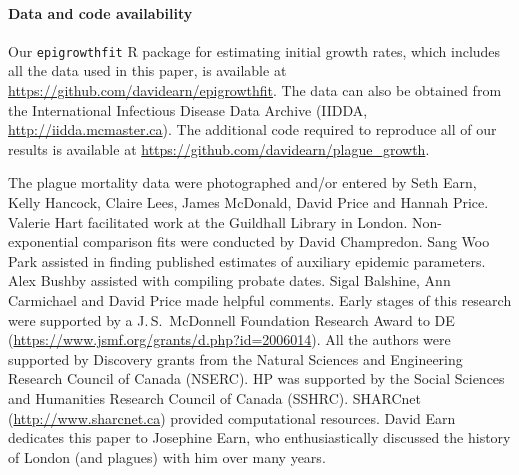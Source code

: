 \hypertarget{data.and.code}{}
\paragraph{Data and code availability}

Our \texttt{epigrowthfit} R package for estimating initial growth
rates, which includes all the data used in this paper, is available at
\url{https://github.com/davidearn/epigrowthfit}.  The data can also be
obtained from the International Infectious Disease Data Archive
(IIDDA, \url{http://iidda.mcmaster.ca}).  The additional code required
to reproduce all of our results is available at
\url{https://github.com/davidearn/plague_growth}.


The plague mortality data were photographed and/or entered by Seth Earn, Kelly Hancock, Claire Lees, James McDonald, David Price and Hannah Price.  Valerie Hart facilitated work at the Guildhall Library in London.  Non-exponential comparison fits were conducted by David Champredon.  Sang Woo Park assisted in finding published estimates of auxiliary epidemic parameters. Alex Bushby assisted with compiling probate dates. Sigal Balshine, Ann Carmichael and David Price made helpful comments.  Early stages of this research were supported by a J.\,S.~McDonnell Foundation Research Award to DE (\url{https://www.jsmf.org/grants/d.php?id=2006014}).  All the authors were supported by Discovery grants from the Natural Sciences and Engineering Research Council of Canada (NSERC). HP was supported by the Social Sciences and Humanities Research Council of Canada (SSHRC). SHARCnet (\url{http://www.sharcnet.ca}) provided computational resources.  David Earn dedicates this paper to Josephine Earn, who enthusiastically discussed the history of London (and plagues) with him over many years.
